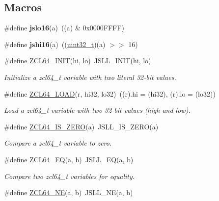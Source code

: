 \subsection*{Macros}
\begin{DoxyCompactItemize}
\item 
\mbox{\label{group__zcl__64_ga82d69c4b59ebfde1f784f7d30246e575}} 
\#define {\bfseries jslo16}(a)~((a) \& 0x0000\+F\+F\+F\+F)
\item 
\mbox{\label{group__zcl__64_ga50ea98cec1c7c8393b65115d0bd756f9}} 
\#define {\bfseries jshi16}(a)~((\hyperlink{group__hal__dos_ga09a1e304d66d35dd47daffee9731edaa}{uint32\+\_\+t})(a) $>$$>$ 16)
\item 
\#define \hyperlink{group__zcl__64_ga8e855e53988a32f4428ceacce4f9870c}{Z\+C\+L64\+\_\+\+I\+N\+IT}(hi,  lo)~J\+S\+L\+L\+\_\+\+I\+N\+IT(hi, lo)
\begin{DoxyCompactList}\small\item\em Initialize a zcl64\+\_\+t variable with two literal 32-\/bit values. \end{DoxyCompactList}\item 
\#define \hyperlink{group__zcl__64_ga899413577d0a7e9b641cc5c309b08aeb}{Z\+C\+L64\+\_\+\+L\+O\+AD}(r,  hi32,  lo32)~((r).hi = (hi32), (r).lo = (lo32))
\begin{DoxyCompactList}\small\item\em Load a zcl64\+\_\+t variable with two 32-\/bit values (high and low). \end{DoxyCompactList}\item 
\#define \hyperlink{group__zcl__64_gad0e4c484d689dee3c5f1302fc80aef3e}{Z\+C\+L64\+\_\+\+I\+S\+\_\+\+Z\+E\+RO}(a)~J\+S\+L\+L\+\_\+\+I\+S\+\_\+\+Z\+E\+RO(a)
\begin{DoxyCompactList}\small\item\em Compare a zcl64\+\_\+t variable to zero. \end{DoxyCompactList}\item 
\#define \hyperlink{group__zcl__64_ga329900843c1e59c30b4bdff95ee594bd}{Z\+C\+L64\+\_\+\+EQ}(a,  b)~J\+S\+L\+L\+\_\+\+EQ(a, b)
\begin{DoxyCompactList}\small\item\em Compare two zcl64\+\_\+t variables for equality. \end{DoxyCompactList}\item 
\#define \hyperlink{group__zcl__64_gaffa76b2bdfb8bc021db06efe331a2e5f}{Z\+C\+L64\+\_\+\+NE}(a,  b)~J\+S\+L\+L\+\_\+\+NE(a, b)
$$
\end{DoxyCompactItemize}

